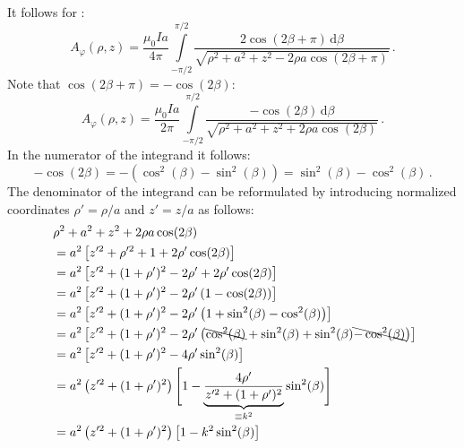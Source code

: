 It follows for :
\begin{equation}
 A_\varphi(\rho, z) = \frac{\mu_0 I a}{4 \pi}
                       \int\limits_{-\pi/2}^{\pi/2}
                         \frac{2 \cos(2 \beta + \pi) \,\mathrm{d}\beta}
                              {\sqrt{\rho^2 + a^2 + z^2 - 2 \rho a \cos(2 \beta + \pi)}} \, .
\end{equation}
Note that $\cos(2 \beta + \pi) = - \cos(2 \beta)$:
\begin{equation}
 A_\varphi(\rho, z) = \frac{\mu_0 I a}{2 \pi}
                       \int\limits_{-\pi/2}^{\pi/2}
                         \frac{-\cos(2 \beta) \,\mathrm{d}\beta}
                              {\sqrt{\rho^2 + a^2 + z^2 + 2 \rho a \cos(2 \beta)}} \, . \label{eqn:a_phi_progress}
\end{equation}
In the numerator of the integrand it follows:
\begin{equation}
 -\cos(2 \beta) = -\left(\cos^2(\beta) - \sin^2(\beta) \right) = \sin^2(\beta) - \cos^2(\beta) \, .
\end{equation}
The denominator of the integrand can be reformulated by introducing normalized coordinates
$\rho' = \rho/a$ and $z' = z/a$ as follows:
\begin{align}
 ~ & \rho^2 + a^2 + z^2 + 2 \rho a \cos(2 \beta) \nonumber \\
 ~ &= a^2 \left[z'^2 +      \rho'^2 + 1        + 2 \rho' \cos(2 \beta)         \right] \nonumber \\
 ~ &= a^2 \left[z'^2 + (1 + \rho')^2 - 2 \rho' + 2 \rho' \cos(2 \beta)         \right] \nonumber \\
 ~ &= a^2 \left[z'^2 + (1 + \rho')^2 - 2 \rho' \left(1 - \cos(2 \beta) \right) \right] \nonumber \\
 ~ &= a^2 \left[z'^2 + (1 + \rho')^2 - 2 \rho' \left(1 + \sin^2(\beta) - \cos^2(\beta) \right) \right] \nonumber \\
 ~ &= a^2 \left[z'^2 + (1 + \rho')^2 - 2 \rho' \left(\bcancel{\cos^2(\beta)} + \sin^2(\beta) + \sin^2(\beta) \bcancel{- \cos^2(\beta)} \right) \right] \nonumber \\
 ~ &= a^2 \left[z'^2 + (1 + \rho')^2 - 4 \rho' \sin^2(\beta) \right] \nonumber \\
 ~ &= a^2 \left( z'^2 + (1 + \rho')^2 \right) \Biggl[1 - \underbrace{\frac{4 \rho'}{z'^2 + (1 + \rho')^2}}_{\equiv k^2} \sin^2(\beta) \Biggr] \nonumber \\
 ~ &= a^2 \left( z'^2 + (1 + \rho')^2 \right) \left [1 - k^2 \sin^2(\beta) \right] \label{eqn:a_phi_denom_refactor_start}
\end{align}
